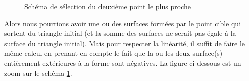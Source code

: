 \begin{figure}[H]
    \centering
    \caption{Schéma de sélection du deuxième point le plus proche}
    \label{fig:deux_pt}
\end{figure}


Alors nous pourrions avoir une ou des surfaces formées par le point cible qui sortent du triangle initial (et la somme des surfaces ne serait pas égale à la surface du triangle initial). Mais pour respecter la linéarité, il suffit de faire le même calcul en prenant en compte le fait que la ou les deux surface(s) entièrement extérieures à la forme sont négatives. La figure ci-dessous est un zoom sur le schéma \ref{fig:deux_pt}.


